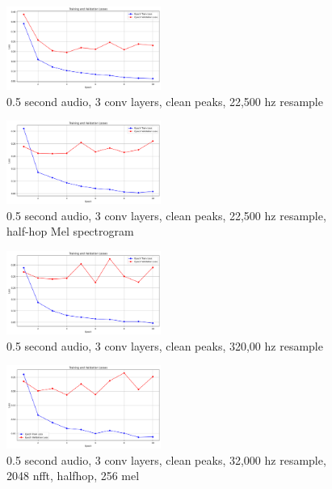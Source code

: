 \documentclass[twocolumn]{article}
\begin{document}
\begin{figure}
\centering
\includegraphics[width=0.45\textwidth]{figures/loss_plot_halfs_3conv_cleanpeaks_22500resample.png}
\caption{0.5 second audio, 3 conv layers, clean peaks, 22,500 hz resample}
\label{fig:halfs_3conv_cleanpeaks_22500hz}
\end{figure}

\begin{figure}
\centering
\includegraphics[width=0.45\textwidth]{figures/loss_plot_halfs_3conv_cleanpeaks_22500resample_halfhop.png}
\caption{0.5 second audio, 3 conv layers, clean peaks, 22,500 hz resample, half-hop Mel spectrogram}
\label{fig:halfs_3conv_cleanpeaks_22500hz_halfhop}
\end{figure}

\begin{figure}
\centering
\includegraphics[width=0.45\textwidth]{figures/loss_plot_halfs_3conv_cleanpeaks_32000resample.png}
\caption{0.5 second audio, 3 conv layers, clean peaks, 320,00 hz resample}
\label{fig:halfs_3conv_cleanpeaks_32000hz}
\end{figure}

\begin{figure}
\centering
\includegraphics[width=0.45\textwidth]{figures/loss_plot_halfs_3conv_cleanpeaks_3200resample_2048nfft_halfhop_256nmel.png}
\caption{0.5 second audio, 3 conv layers, clean peaks, 32,000 hz resample, 2048 nfft, halfhop, 256 mel}
\label{fig:halfs_3conv_cleanpeaks_3200resample_2048nfft_halfhop_256nmel}
\end{figure}
\end{document}
